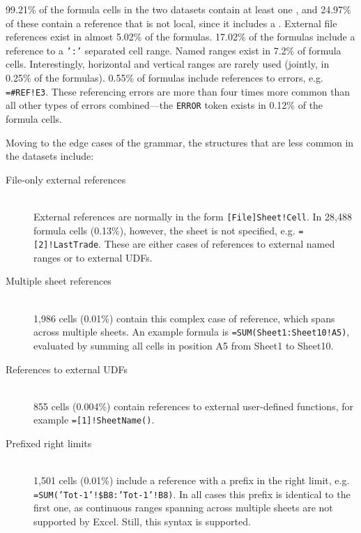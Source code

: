 \documentclass[conference]{IEEEtran}
\begin{document}
99.21\% of the formula cells in the two datasets contain at least one , and 24.97\% of these contain a reference that is not local, since it includes a . External file references exist in almost 5.02\% of the formulas. 17.02\% of the formulas include a reference to a \texttt{':'} separated cell range. Named ranges exist in 7.2\% of formula cells. Interestingly, horizontal and vertical ranges are rarely used (jointly, in 0.25\% of the formulas). 0.55\% of formulas include references to errors, e.g. \texttt{=\#REF!E3}. These referencing errors are more than four times more common than all other types of errors combined---the \texttt{ERROR} token exists in 0.12\% of the formula cells.

Moving to the edge cases of the grammar, the structures that are less common in the datasets include:
\begin{description}
	\item[File-only external references] \hfill \\
	External references are normally in the form \texttt{[File]Sheet!Cell}. In 28,488 formula cells (0.13\%), however, the sheet is not specified, e.g. \texttt{=[2]!LastTrade}. These are either cases of references to external named ranges or to external UDFs.
	\item[Multiple sheet references] \hfill \\
	1,986 cells (0.01\%) contain this complex case of reference, which spans across multiple sheets. An example formula is \texttt{=SUM(Sheet1:Sheet10!A5)}, evaluated by summing all cells in position A5 from Sheet1 to Sheet10.
	\item[References to external UDFs] \hfill \\
	855 cells (0.004\%) contain references to external user-defined functions, for example \texttt{=[1]!SheetName()}.
	\item[Prefixed right limits] \hfill \\
	1,501 cells (0.01\%) include a reference with a prefix in the right limit, e.g. \texttt{=SUM('Tot-1'!\$B8:'Tot-1'!B8)}. In all cases this prefix is identical to the first one, as continuous ranges spanning across multiple sheets are not supported by Excel. Still, this syntax is supported.
\end{description}
\end{document}
